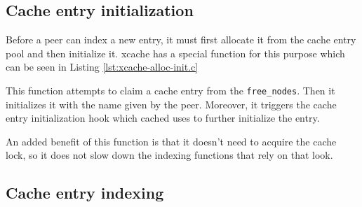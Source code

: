 \begin{comment}
	The rest willwhaLet's start by listing what \texttt{xcache entry} 
	consists of.  First of all, it must have a name.  Since we preallocate 
	the entries and cannot know in runtime their length, we must allocate 
	as much space as possible. The \texttt{char name[XSEG\_MAX\_TARGETLEN + 
		1]} field, which is 256 characters long, is long enough to hold the 
	target's name.  Also, as we have mentioned in Section 
	\ref{sec:entry-prealloc-design}, xcache must be agnostic of the cache 
	contents.  To this end, we use the generic \texttt{void *priv} field as 
	a pointer to the actual entry content.  The rest of the fields will be 
	explained in the following chapters.

	Let's continue now with the fields of Listing \ref{lst:xcache-prealloc.h}.  
	Since we preallocate the entries using \texttt{malloc}, they take up a 
	contiguous space in memory.  The start of this space is the where the 
	\texttt{*nodes} field points to. The \texttt{free\_nodes} field works similarly 
	to the free\_entries field in Section \ref{sec:get-req-archip} i.e. it is a 
	stack where indexes to unused nodes are pushed. These indexes will be seen in 
	various code excerpts in this chapter and have a specific name, 
	\texttt{xcache\_handler}\footnote{\#define xcache\_handler uint64\_t}.
\end{comment}

\subsection{Cache entry initialization}

Before a peer can index a new entry, it must first allocate it from the cache 
entry pool and then initialize it. xcache has a special function for this 
purpose which can be seen in Listing \ref{lst:xcache-alloc-init.c}


This function attempts to claim a cache entry from the \texttt{free\_nodes}.  
Then it initializes it with the name given by the peer. Moreover, it triggers 
the cache entry initialization hook which cached uses to further initialize the 
entry.

An added benefit of this function is that it doesn't need to acquire the cache 
lock, so it does not slow down the indexing functions that rely on that look.

\subsection{Cache entry indexing}

